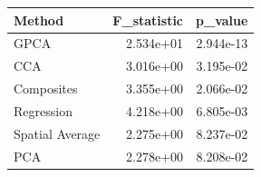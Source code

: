 \begin{tabular}{lrr}
\toprule
Method & F_statistic & p_value \\
\midrule
GPCA & 2.534e+01 & 2.944e-13 \\
CCA & 3.016e+00 & 3.195e-02 \\
Composites & 3.355e+00 & 2.066e-02 \\
Regression & 4.218e+00 & 6.805e-03 \\
Spatial Average & 2.275e+00 & 8.237e-02 \\
PCA & 2.278e+00 & 8.208e-02 \\
\bottomrule
\end{tabular}
